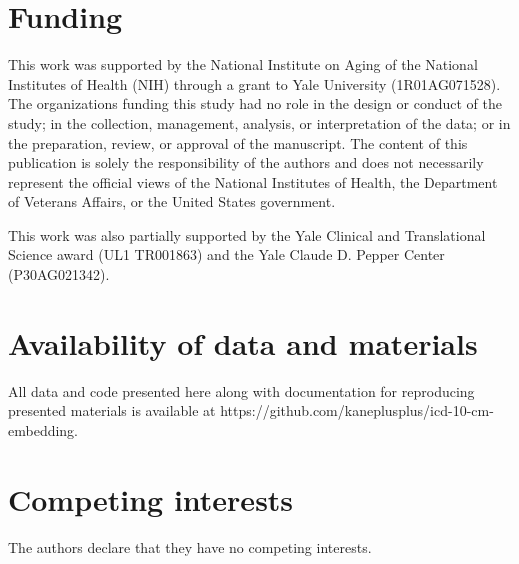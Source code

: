 \documentclass{bmcart}
\begin{document}
\begin{backmatter}


\section*{Funding}%

This work was supported by the National Institute on Aging of the 
National Institutes of Health (NIH) through a grant to Yale 
University (1R01AG071528). The organizations funding this study had no role 
in the design or conduct of the study; in the collection, management, 
analysis, or interpretation of the data; or in the preparation, review, or 
approval of the manuscript. The content of this publication is solely the 
responsibility of the authors and does not necessarily represent the official 
views of the National Institutes of Health, the Department of Veterans 
Affairs, or the United States government. 

This work was also partially supported by the Yale Clinical and 
Translational Science award (UL1 TR001863) and the Yale Claude D. Pepper 
Center (P30AG021342).


\section*{Availability of data and materials}%

All data and code presented here along with documentation for 
reproducing presented materials is available at 
https://github.com/kaneplusplus/icd-10-cm-embedding.


\section*{Competing interests}
The authors declare that they have no competing interests.


\end{backmatter}
\end{document}
